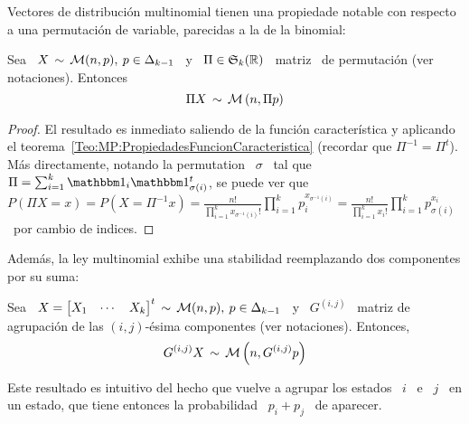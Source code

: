 Vectores  de  distribuci\'on  multinomial  tienen  una  propiedade  notable  con
respecto a una permutaci\'on de variable, parecidas a la de la binomial:
%
\begin{lema}\label{Lem:MP:PermutacionMultinomial}
%
  Sea \ $X \, \sim \, \mathcal{M}(n,p), \: p \in \Delta_{k-1}$ \ y \ $\Pi \in \mathfrak{S}_k(\mathbb{R})$ \
  matriz \ de permutaci\'on (ver notaciones). Entonces
  \[
  \Pi X \, \sim \, \mathcal{M}\left( n ,  \Pi p \right)
  \]
\end{lema}
%
\begin{proof}
  El  resultado  es  inmediato  saliendo  de  la  funci\'on  caracter\'istica  y
  aplicando  el  teorema~\ref{Teo:MP:PropiedadesFuncionCaracteristica} (recordar
  que $\Pi^{-1} = \Pi^t$). M\'as directamente, notando la permutation \ $\sigma$
  \ tal que  \ $\Pi = \sum_{i=1}^k \un_i \un_{\sigma(i)}^t$, se  puede ver que \
  $\displaystyle  P(\Pi X =  x) =  P(X =  \Pi^{-1} x)  = \frac{n!}{\prod_{i=1}^k
    x_{\sigma^{-1}(i)}!}       \prod_{i=1}^k      p_i^{x_{\sigma^{-1}(i)}}     =
  \frac{n!}{\prod_{i=1}^k x_i!}  \prod_{i=1}^k p_{\sigma(i)}^{x_i}$ \ por cambio
  de indices.
\end{proof}
%
Adem\'as, la ley multinomial  exhibe una stabilidad reemplazando dos componentes
por su suma:
%
\begin{lema}\label{Lem:MP:StabAgregacionMultinomial}
%
  Sea  \ $X =  \begin{bmatrix} X_1  & \cdots  & X_k  \end{bmatrix}^t \,  \sim \,
  \mathcal{M}(n,p), \:  p \in \Delta_{k-1}$ \ y  \ $G^{(i,j)}$ \ matriz  de agrupaci\'on de
  las $(i,j)$-\'esima componentes (ver notaciones). Entonces,
  \[
  G^{(i,j)} X \, \sim \, \mathcal{M}\left( n , G^{(i,j)} p \right)  
  \]
\end{lema}
%
Este resultado es intuitivo del hecho que vuelve a agrupar los estados \ $i$ \ e
\ $j$  \ en un  estado, que tiene  entonces la probabilidad \  $p_i + p_j$  \ de
aparecer.
%

